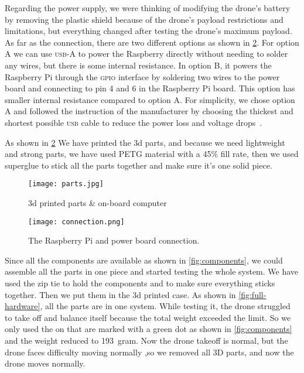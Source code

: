 \documentclass[../main.tex]{subfiles}
\begin{document}
Regarding the power supply, we were thinking 
of modifying the drone's battery by removing the 
plastic shield because of the drone's payload restrictions 
and limitations, but everything changed after testing 
the drone's maximum payload.
As far as the connection, there are 
two different options as shown in \cref{fig:connection}.
For option A we can use \textsc{usb}-A to power the Raspberry directly 
without needing to solder any wires, but there is some internal resistance.
In option B, it powers the Raspberry Pi through the \textsc{gpio} 
interface by soldering two wires to the power board and 
connecting to pin 4 and 6 in the Raspberry Pi board.
This option has smaller internal resistance compared to option A.
For simplicity, we chose option A and   
followed the instruction of the manufacturer by choosing 
the thickest and shortest possible \textsc{usb} cable to reduce 
the power loss and voltage drops~\cite{makerfocus}.

As shown in \cref{fig:connection} We have printed the 3d 
parts, and because we need lightweight and strong parts, 
we have used PETG material with a 45\% fill rate, 
then we used superglue to stick all the parts together 
and make sure it's one solid piece.

\begin{figure}[p]
	\centering
	\texttt{[image: parts.jpg]}
	\caption{3d printed parts \& on-board computer}
	\label{fig:printed-parts}
\end{figure} 

\begin{figure}[p]
	\centering
	\texttt{[image: connection.png]}
	\caption{The Raspberry Pi and power board connection.}
	\label{fig:connection}
\end{figure}  

Since all the components are available as shown 
in \cref{fig:components}, we could assemble 
all the parts in one piece and started testing the whole system.
We have used the zip tie to hold the components and to
make sure everything sticks together. Then we put them in the 3d
printed case. As shown in 
\cref{fig:full-hardware}, all the parts are in one system. 
While testing it, the drone struggled to take off and balance itself
because the total weight exceeded the limit. So we
only used the on that are marked with a green dot 
as shown in \cref{fig:components} and the weight reduced to \SI{193}{gram}. 
Now the drone takeoff is normal, but the drone faces difficulty moving normally ,so we removed all 3D parts, and now the drone moves normally.
\end{document}
